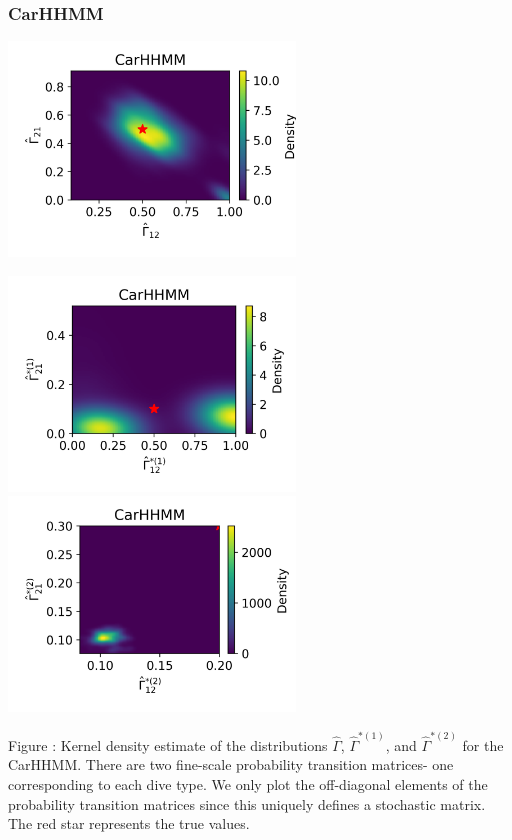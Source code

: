 \documentclass{article}
\begin{document}
        \newpage
        \subsubsection{CarHHMM}
        \begin{center}
        \includegraphics[width=3in]{../Plots/hhmm_V_Gamma_density_-1.png}
        
        \includegraphics[width=3in]{../Plots/hhmm_V_Gamma_density_0.png}
        \includegraphics[width=3in]{../Plots/hhmm_V_Gamma_density_1.png}
        \end{center}
        
        \noindent Figure : Kernel density estimate of the distributions $\hat \Gamma$, $\hat \Gamma^{*(1)}$, and $\hat \Gamma^{*(2)}$ for the CarHHMM. There are two fine-scale probability transition matrices- one corresponding to each dive type. We only plot the off-diagonal elements of the probability transition matrices since this uniquely defines a stochastic matrix. The red star represents the true values.
        \addtocounter{fignum}{1}
        
\end{document}
